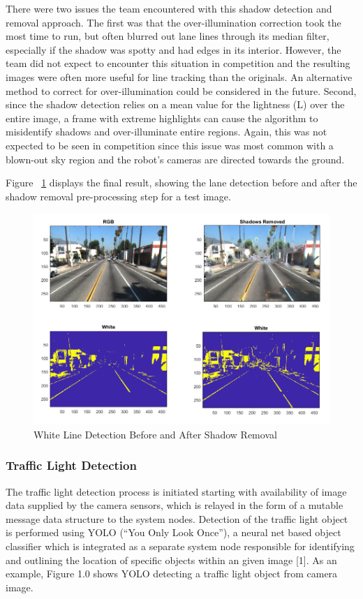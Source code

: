 \documentclass[11pt,journal]{IEEEtran}
\begin{document}
There were two issues the team encountered with this shadow detection and removal approach. The first was that the over-illumination correction took the most time to run, but often blurred out lane lines through its median filter, especially if the shadow was spotty and had edges in its interior. However, the team did not expect to encounter this situation in competition and the resulting images were often more useful for line tracking than the originals. An alternative method to correct for over-illumination could be considered in the future. Second, since the shadow detection relies on a mean value for the lightness (L) over the entire image, a frame with extreme highlights can cause the algorithm to misidentify shadows and over-illuminate entire regions. Again, this was not expected to be seen in competition since this issue was most common with a blown-out sky region and the robot's cameras are directed towards the ground.

Figure ~\ref{Shadow6} displays the final result, showing the lane detection before and after the shadow removal pre-processing step for a test image.

\begin{figure}[ht]
\centerline{\includegraphics[width=0.9\columnwidth]{X6.png}}
\caption{White Line Detection Before and After Shadow Removal}
\label{Shadow6}
\end{figure}

\subsubsection{Traffic Light Detection}
The traffic light detection process is initiated starting with availability of image data supplied by the camera sensors, which is relayed in the form of a mutable message data structure to the system nodes. Detection of the traffic light object is performed using YOLO (“You Only Look Once”), a neural net based object classifier which is integrated as a separate system node responsible for identifying and outlining the location of specific objects within an given image [1]. As an example, Figure 1.0 shows YOLO detecting a traffic light object from camera image.
\end{document}

